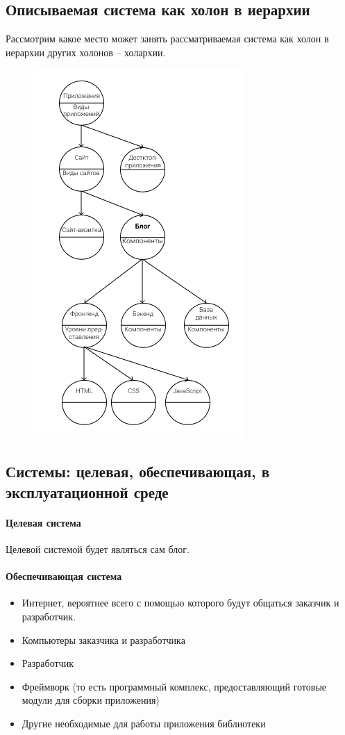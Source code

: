 \documentclass[bibliography=totocnumbered]{scrartcl}
\begin{document}
\subsection{Описываемая система как холон в иерархии}
Рассмотрим какое место может занять рассматриваемая система как холон в иерархии других холонов -- холархии.
\begin{figure}[!htp]
    \centering \includegraphics[scale=1]{hol_it.png}
\end{figure}
\subsection{Системы: целевая, обеспечивающая, в эксплуатационной среде}

\paragraph{Целевая система}
Целевой системой будет являться сам блог.

\paragraph{Обеспечивающая система}
\begin{itemize}
    \item Интернет, вероятнее всего с помощью которого будут общаться заказчик и разработчик.
    \item Компьютеры заказчика и разработчика
    \item Разработчик
    \item Фреймворк (то есть программный комплекс, предоставляющий готовые модули для сборки приложения)
    \item Другие необходимые для работы приложения библиотеки
\end{itemize}
\end{document}
